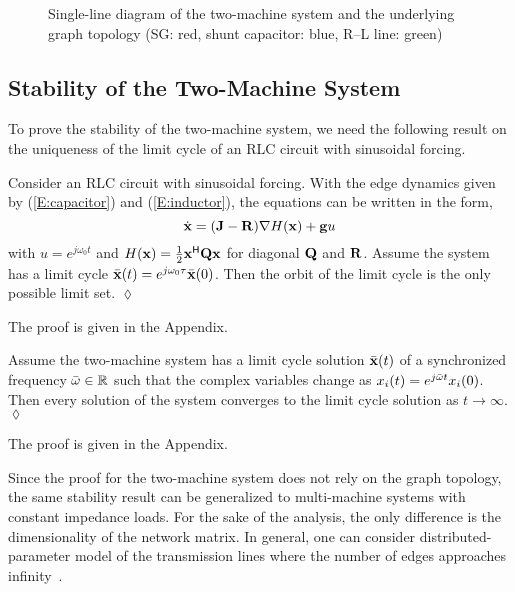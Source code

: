 \begin{figure}[!t]
\hfill
{}
\caption{Single-line diagram of the two-machine system and the underlying graph topology (SG: red, shunt capacitor: blue, R--L line: green)}
\label{fig_topology}
\hfill\end{figure}

\subsection{Stability of the Two-Machine System}

To prove the stability of the two-machine system, we need the following result on the uniqueness of the limit cycle of an RLC circuit with sinusoidal forcing.

\begin{lemma} \label{lem_RLC}
Consider an RLC circuit with sinusoidal forcing. With the edge dynamics given by (\ref{E:capacitor}) and (\ref{E:inductor}), the equations can be written in the form,
\begin{equation*}
    \dot{\mathbf{x}} = (\mathbf{J} - \mathbf{R}) \nabla H(\mathbf{x}) + \mathbf{g} u
\end{equation*}
with $u = e^{j\omega_0 t}$ and $H(\mathbf{x}) = \frac{1}{2} \mathbf{x}^{\mathsf{H}} \mathbf{Q} \mathbf{x}$ for diagonal $\mathbf{Q}$ and $\mathbf{R}$. Assume the system has a limit cycle $\bar{\mathbf{x}}(t) = e^{j\omega_0 \tau} \bar{\mathbf{x}}(0)$. Then the orbit of the limit cycle is the only possible limit set. \hfill $\lozenge$
\end{lemma}

The proof is given in the Appendix.


\begin{proposition} \label{prop_final}
Assume the two-machine system has a limit cycle solution $\bar{\mathbf{x}}(t)$ of a synchronized frequency $\bar{\omega} \in \mathbb{R}$ such that the complex variables change as $x_i(t) = e^{j\bar{\omega} t} x_i(0)$. Then every solution of the system converges to the limit cycle solution as $t \to \infty$. \hfill $\lozenge$
\end{proposition}

The proof is given in the Appendix.

Since the proof for the two-machine system does not rely on the graph topology, the same stability result can be generalized to multi-machine systems with constant impedance loads. For the sake of the analysis, the only difference is the dimensionality of the network matrix. In general, one can consider distributed-parameter model of the transmission lines where the number of edges approaches infinity~\cite{watson2021scalable}.

